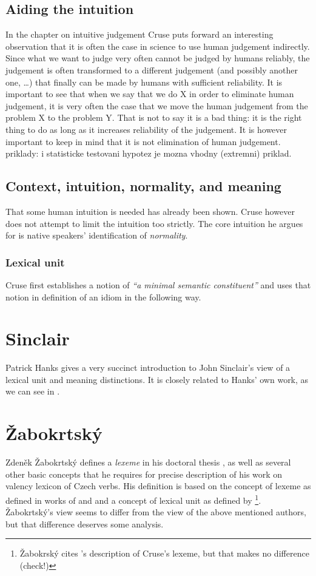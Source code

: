 \subsection{Aiding the intuition}
In the chapter on intuitive judgement Cruse puts forward an interesting observation that it is often the case in science to use human judgement indirectly. Since what we want to judge very often cannot be judged by humans reliably, the judgement is often transformed to a different judgement (and possibly another one, \ldots) that finally can be made by humans with sufficient reliability. It is important to see that when we say that we do X in order to eliminate human judgement, it is very often the case that we move the human judgement from the problem X to the problem Y. That is not to say it is a bad thing: it is the right thing to do as long as it increases reliability of the judgement. It is however important to keep in mind that it is not elimination of human judgement. {\xxx priklady: i statisticke testovani hypotez je mozna vhodny (extremni) priklad.}

\subsection{Context, intuition, normality, and meaning}
That some human intuition is needed has already been shown. Cruse however does not attempt to limit the intuition too strictly. The core intuition he argues for is native speakers' identification of \emph{normality}. 

\subsubsection{Lexical unit}
Cruse first establishes a notion of \emph{``a minimal semantic constituent''} and uses that notion in definition of an idiom in the following way.


\section{Sinclair}
Patrick Hanks gives a very succinct introduction to John Sinclair's \citep{sinclair:wiki} view of a lexical unit and meaning distinctions. It is closely related to Hanks' own work, as we can see in \citet{hanks:norms}.

\section{Žabokrtský}
Zdeněk Žabokrtský defines a \emph{lexeme} in his doctoral thesis \citep{zabokrtsky:2005a}, as well as several other basic concepts that he requires for precise description of his work on valency lexicon of Czech verbs. His definition is based on the concept of lexeme as defined in works of \citet{cermak:91} and \citet{filipec:1994} and a concept of lexical unit as defined by \citet{cruse:1986}\footnote{Žabokrský cites \citealp{verspoor:1997}'s description of Cruse's lexeme, but that makes no difference {\xxx(check!)}}. Žabokrtský's view seems to differ from the view of the above mentioned authors, but that difference deserves some analysis.

